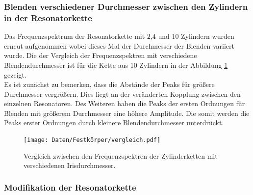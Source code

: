 \subsubsection{Blenden verschiedener Durchmesser zwischen den Zylindern in der Resonatorkette}

Das Frequenzspektrum der Resonatorkette mit $2$,$4$ und $10$ Zylindern wurden erneut aufgenommen wobei dieses Mal der Durchmesser der Blenden variiert wurde. 
Die der Vergleich der Frequenzspektren mit verschiedene Blendendurchmesser ist für die Kette aus 10 Zylindern in der Abbildung \ref{fig:fkvergleich} gezeigt. \\
Es ist zunächst zu bemerken, dass die Abstände der Peaks für größere Durchmesser vergrößern. Dies liegt an der veränderten Kopplung zwischen den einzelnen Resonatoren. 
Des Weiteren haben die Peaks der ersten Ordnungen für Blenden mit größerem Durchmesser eine höhere Amplitude. Die somit werden die Peaks erster Ordnungen durch kleinere Blendendurchmesser unterdrückt. 

\begin{figure}
  \centering
  \texttt{[image: Daten/Festkörper/vergleich.pdf]}
  \caption{Vergleich zwischen den Frequenzspektren der Zylinderketten mit verschiedenen Irisdurchmesser.}
  \label{fig:fkvergleich}
\end{figure}
\subsubsection{Modifikation der Resonatorkette}